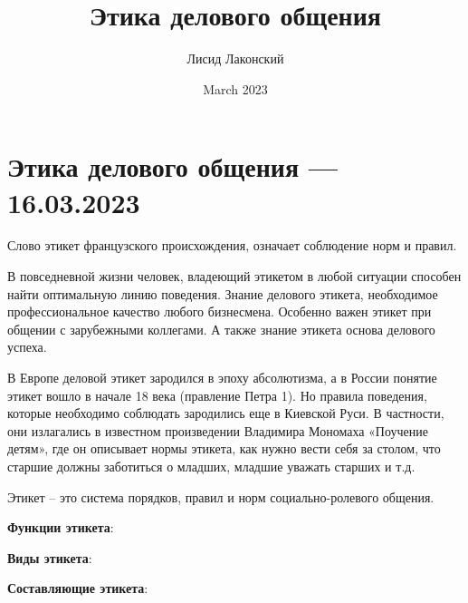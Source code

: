 \documentclass{article}
\title{Этика делового общения}
\author{Лисид Лаконский}
\date{March 2023}
\begin{document}
\raggedright

\maketitle
\tableofcontents
\pagebreak

\section{Этика делового общения — 16.03.2023}

Слово этикет французского происхождения, означает соблюдение норм
и правил.

В повседневной жизни человек, владеющий этикетом в любой ситуации
способен найти оптимальную линию поведения. Знание делового этикета, необходимое профессиональное качество любого бизнесмена. Особенно важен этикет при общении с зарубежными коллегами. А также знание этикета основа делового успеха.

В Европе деловой этикет зародился в эпоху абсолютизма, а в России понятие этикет вошло в начале 18 века (правление Петра 1). Но правила поведения, которые необходимо соблюдать зародились еще в Киевской Руси. В частности, они излагались в известном произведении Владимира Мономаха «Поучение детям», где он описывает нормы этикета, как нужно вести себя за столом, что старшие должны заботиться о младших, младшие уважать
старших и т.д.

Этикет – это система порядков, правил и норм социально-ролевого
общения.

\textbf{Функции этикета}:

\begin{multienumerate}
\end{multienumerate}

\textbf{Виды этикета}:

\begin{multienumerate}
\end{multienumerate}

\textbf{Составляющие этикета}:

\begin{multienumerate}
\end{multienumerate}
\end{document}
